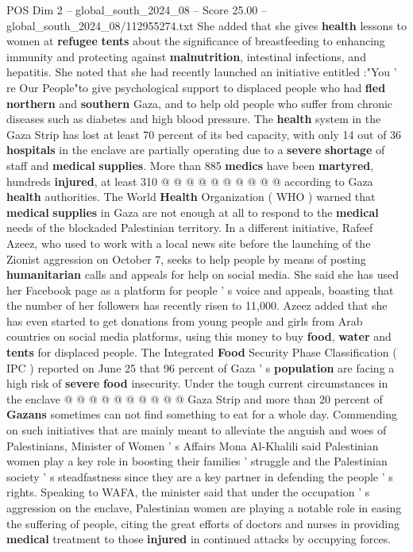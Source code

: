 \begin{textsample}{POS Dim 2 – global\_south\_2024\_08 – Score 25.00 – global\_south\_2024\_08/112955274.txt}
She added that she gives \textbf{health} lessons to women at \textbf{refugee} \textbf{tents} about the significance of breastfeeding to enhancing immunity and protecting against \textbf{malnutrition}, intestinal infections, and hepatitis.
She noted that she had recently launched an initiative entitled :"You ' re Our People"to give psychological support to displaced people who had \textbf{fled} \textbf{northern} and \textbf{southern} Gaza, and to help old people who suffer from chronic diseases such as diabetes and high blood pressure.
The \textbf{health} system in the Gaza Strip has lost at least 70 percent of its bed capacity, with only 14 out of 36 \textbf{hospitals} in the enclave are partially operating due to a \textbf{severe} \textbf{shortage} of staff and \textbf{medical} \textbf{supplies}.
More than 885 \textbf{medics} have been \textbf{martyred}, hundreds \textbf{injured}, at least 310 @ @ @ @ @ @ @ @ @ @ according to Gaza \textbf{health} authorities.
The World \textbf{Health} Organization ( WHO ) warned that \textbf{medical} \textbf{supplies} in Gaza are not enough at all to respond to the \textbf{medical} needs of the blockaded Palestinian territory.
In a different initiative, Rafeef Azeez, who used to work with a local news site before the launching of the Zionist aggression on October 7, seeks to help people by means of posting \textbf{humanitarian} calls and appeals for help on social media.
She said she has used her Facebook page as a platform for people ' s voice and appeals, boasting that the number of her followers has recently risen to 11,000.
Azeez added that she has even started to get donations from young people and girls from Arab countries on social media platforms, using this money to buy \textbf{food}, \textbf{water} and \textbf{tents} for displaced people.
The Integrated \textbf{Food} Security Phase Classification ( IPC ) reported on June 25 that 96 percent of Gaza ' s \textbf{population} are facing a high risk of \textbf{severe} \textbf{food} insecurity.
Under the tough current circumstances in the enclave @ @ @ @ @ @ @ @ @ @ Gaza Strip and more than 20 percent of \textbf{Gazans} sometimes can not find something to eat for a whole day.
Commending on such initiatives that are mainly meant to alleviate the anguish and woes of Palestinians, Minister of Women ' s Affairs Mona Al-Khalili said Palestinian women play a key role in boosting their families ' struggle and the Palestinian society ' s steadfastness since they are a key partner in defending the people ' s rights.
Speaking to WAFA, the minister said that under the occupation ' s aggression on the enclave, Palestinian women are playing a notable role in easing the suffering of people, citing the great efforts of doctors and nurses in providing \textbf{medical} treatment to those \textbf{injured} in continued attacks by occupying forces.

\end{textsample}
